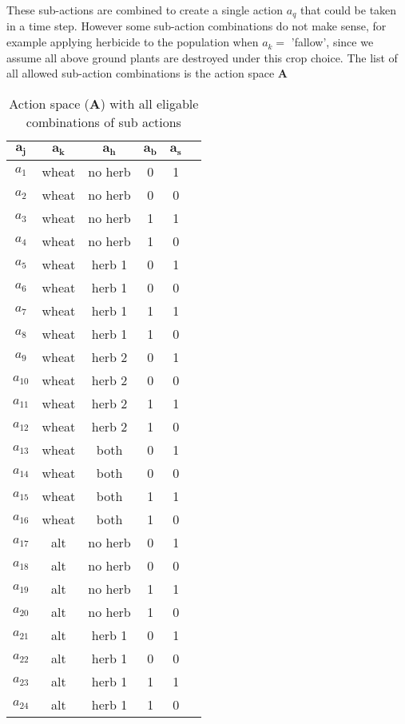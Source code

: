 \documentclass[12pt, a4paper]{article}
\begin{document}
\newpage
These sub-actions are combined to create a single action $a_q$ that could be taken in a time step. However some sub-action combinations do not make sense, for example applying herbicide to the population when $a_k =$ 'fallow', since we assume all above ground plants are destroyed under this crop choice. The list of all allowed sub-action combinations is the action space $\mathbf{A}$   

\begin{longtable}[h]{c c c c c c}
\caption{Action space ($\mathbf{A}$) with all eligable combinations of sub actions\label{table:action_space}}\\
	\hline
	$\mathbf{a_j}$ & $\mathbf{a_k}$ & $\mathbf{a_h}$ & $\mathbf{a_b}$ & $\mathbf{a_s}$\\
	\hline
	$a_1$ & wheat & no herb & 0 & 1\\
	$a_2$ & wheat & no herb & 0 & 0\\
	$a_3$ & wheat & no herb & 1 & 1\\
	$a_4$ & wheat & no herb & 1 & 0\\
	$a_5$ & wheat & herb 1 & 0 & 1\\
	$a_6$ & wheat & herb 1 & 0 & 0\\
	$a_7$ & wheat & herb 1 & 1 & 1\\
	$a_8$ & wheat & herb 1 & 1 & 0\\
	$a_9$ & wheat & herb 2 & 0 & 1\\
	$a_{10}$ & wheat & herb 2 & 0 & 0\\
	$a_{11}$ & wheat & herb 2 & 1 & 1\\
	$a_{12}$ & wheat & herb 2 & 1 & 0\\
	$a_{13}$ & wheat & both & 0 & 1\\
	$a_{14}$ & wheat & both & 0 & 0\\
	$a_{15}$ & wheat & both & 1 & 1\\
	$a_{16}$ & wheat & both & 1 & 0\\
	$a_{17}$ & alt & no herb & 0 & 1\\
	$a_{18}$ & alt & no herb & 0 & 0\\
	$a_{19}$ & alt & no herb & 1 & 1\\
	$a_{20}$ & alt & no herb & 1 & 0\\
	$a_{21}$ & alt & herb 1 & 0 & 1\\
	$a_{22}$ & alt & herb 1 & 0 & 0\\
	$a_{23}$ & alt & herb 1 & 1 & 1\\
	$a_{24}$ & alt & herb 1 & 1 & 0\\

\end{longtable}
\end{document}
